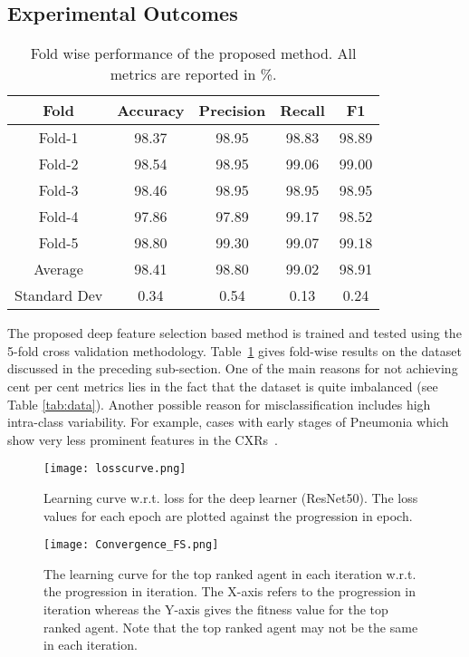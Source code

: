 \documentclass[final,3p,times]{elsarticle}
\begin{document}
\subsection{Experimental Outcomes}
\begin{table}[ht!]
    \centering
    \caption{Fold wise performance of the proposed method. All metrics are reported in \%.}
    \begin{tabular}{c|cccc}
    \toprule
        Fold & Accuracy & Precision & Recall & F1  \\
        \midrule
        Fold-1 & 98.37 & 98.95 & 98.83 & 98.89\\
        Fold-2 & 98.54 & 98.95 & 99.06 & 99.00\\
        Fold-3 & 98.46 & 98.95 & 98.95 & 98.95\\
        Fold-4 & 97.86 & 97.89 & 99.17 & 98.52\\
        Fold-5 & 98.80 & 99.30 & 99.07 & 99.18\\
        \midrule
        Average & 98.41 & 98.80 & 99.02 & 98.91\\
        Standard Dev & 0.34 & 0.54 & 0.13 &0.24\\
        \bottomrule
    \end{tabular}
    \label{tab:foldwise}
\end{table}
The proposed deep feature selection based method is trained and tested using the 5-fold cross validation methodology. Table~\ref{tab:foldwise} gives fold-wise results on the dataset discussed in the preceding sub-section. One of the main reasons for not achieving cent per cent metrics lies in the fact that the dataset is quite imbalanced (see Table \ref{tab:data}). Another possible reason for {misclassification} includes high intra-class variability. For example, cases with early stages of Pneumonia which show very less prominent features in the CXRs~\cite{zhang2021viral}.
\begin{figure}[ht!]
    \centering
    \texttt{[image: losscurve.png]}
    \caption{Learning curve w.r.t. loss for the deep learner (ResNet50). The loss values for each epoch are plotted against the progression in epoch.}
    \label{fig:loss}
\end{figure}
\begin{figure}[ht!]
    \centering
    \texttt{[image: Convergence\_FS.png]}
    \caption{The learning curve for the top ranked agent in each iteration w.r.t. the progression in iteration. The X-axis refers to the progression in iteration whereas the Y-axis gives the fitness value for the top ranked agent. Note that the top ranked agent may not be the same in each iteration.}
    \label{fig:fsconv}
\end{figure}
\end{document}
